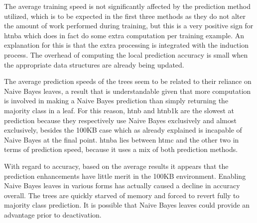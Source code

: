The average training speed is not significantly affected by the prediction method utilized, which is to be expected in the first three methods as they do not alter the amount of work performed during training, but this is a very positive sign for {\sc htnba} which does in fact do some extra computation per training example. An explanation for this is that the extra processing is integrated with the induction process. The overhead of computing the local prediction accuracy is small when the appropriate data structures are already being updated.

The average prediction speeds of the trees seem to be related to their reliance on Naive Bayes leaves, a result that is understandable given that more computation is involved in making a Naive Bayes prediction than simply returning the majority class in a leaf. For this reason, {\sc htnb} and {\sc htnb1k} are the slowest at prediction because they respectively use Naive Bayes exclusively and almost exclusively, besides the 100KB case which as already explained is incapable of Naive Bayes at the final point. {\sc htnba} lies between {\sc htmc} and the other two in terms of prediction speed, because it uses a mix of both prediction methods.

With regard to accuracy, based on the average results it appears that the prediction enhancements have little merit in the 100KB environment. Enabling Naive Bayes leaves in various forms has actually caused a decline in accuracy overall. The trees are quickly starved of memory and forced to revert fully to majority class prediction. 
It is possible that Naive Bayes leaves could provide an advantage prior to deactivation.

